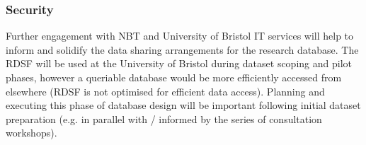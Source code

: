 \documentclass{article}
\begin{document}
\subsubsection{Security}

Further engagement with NBT and University of Bristol IT services will
help to inform and solidify the data sharing arrangements for the
research database. The RDSF will be used at the University of Bristol
during dataset scoping and pilot phases, however a queriable database
would be more efficiently accessed from elsewhere (RDSF is not
optimised for efficient data access). Planning and executing this
phase of database design will be important following initial dataset
preparation (e.g. in parallel with / informed by the series of
consultation workshops).




\appendix
\end{document}
